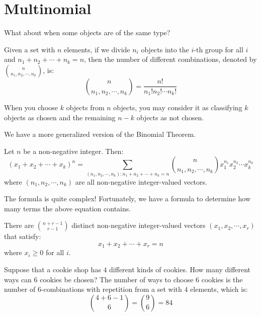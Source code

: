 \documentclass{huhtakm-template-book-v2}
\begin{document}
\section{Multinomial}
    What about when some objects are of the same type?
    \begin{thm}
        Given a set with $n$ elements, if we divide $n_{i}$ objects into the $i$-th group for all $i$ and $n_{1}+n_{2}+\cdots+n_{k} = n$, then the number of different combinations, denoted by $\binom{n}{n_{1},n_{2},\cdots,n_{k}}$, is:
        \begin{equation*}
            \binom{n}{n_{1},n_{2},\cdots,n_{k}} = \frac{n!}{n_{1}!n_{2}!\cdots n_{k}!}
        \end{equation*}
    \end{thm}
    \begin{rem}
        When you choose $k$ objects from $n$ objects, you may consider it as classifying $k$ objects as chosen and the remaining $n-k$ objects as not chosen. 
    \end{rem}
    We have a more generalized version of the Binomial Theorem.
    \begin{thm}
        Let $n$ be a non-negative integer. Then:
        \begin{equation*}
            (x_{1}+x_{2}+\cdots+x_{k})^{n} = \sum_{(n_{1},n_{2},\cdots,n_{k}):n_{1}+n_{2}+\cdots+n_{k} = n}\binom{n}{n_{1},n_{2},\cdots,n_{k}}x_{1}^{n_{1}}x_{2}^{n_{2}}\cdots x_{k}^{n_{k}}
        \end{equation*}
        where $(n_{1},n_{2},\cdots,n_{k})$ are all non-negative integer-valued vectors.
    \end{thm}
    The formula is quite complex! Fortunately, we have a formula to determine how many terms the above equation contains.
    \begin{thm}
        There are $\binom{n+r-1}{r-1}$ distinct non-negative integer-valued vectors $(x_{1},x_{2},\cdots,x_{r})$ that satisfy:
        \begin{equation*}
            x_{1}+x_{2}+\cdots+x_{r} = n
        \end{equation*}
        where $x_{i} \geq 0$ for all $i$.
    \end{thm}
    \begin{eg}
        Suppose that a cookie shop has $4$ different kinds of cookies. How many different ways can $6$ cookies be chosen? The number of ways to choose $6$ cookies is the number of $6$-combinations with repetition from a set with $4$ elements, which is:
        \begin{equation*}
            \binom{4+6-1}{6} = \binom{9}{6} = 84
        \end{equation*}
    \end{eg}
\end{document}
